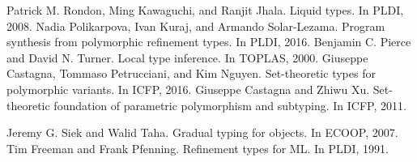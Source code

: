 \documentclass[sigplan]{acmart}
\theoremstyle{definition}
\begin{document}
\begin{thebibliography}{}

\bibitem{} Patrick M. Rondon, Ming Kawaguchi, and Ranjit Jhala. Liquid types. In PLDI, 2008.
\bibitem{} 
Nadia Polikarpova, Ivan Kuraj, and Armando Solar-Lezama. Program synthesis from polymorphic refinement types. In PLDI, 2016.
\bibitem{} Benjamin C. Pierce and David N. Turner. Local type inference. In TOPLAS, 2000.
\bibitem{} Giuseppe Castagna, Tommaso Petrucciani, and Kim Nguyen. Set-theoretic types for polymorphic variants. In ICFP, 2016.
\bibitem{} Giuseppe Castagna and Zhiwu Xu. Set-theoretic foundation of parametric polymorphism and subtyping. In ICFP, 2011.

\bibitem{} Jeremy G. Siek and Walid Taha. Gradual typing for objects. In ECOOP, 2007.
\bibitem{} Tim Freeman and Frank Pfenning. Refinement types for ML. In PLDI, 1991.


\end{thebibliography}
\end{document}
